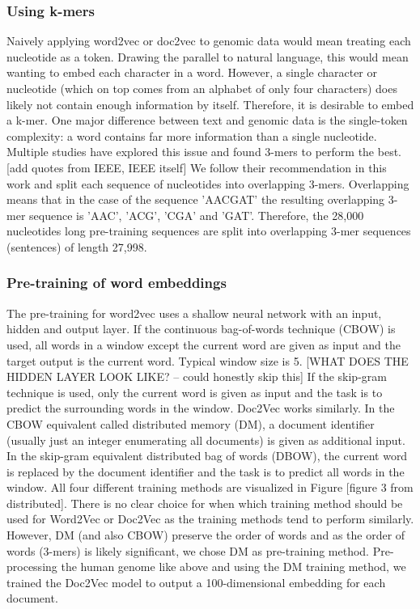 \subsubsection{Using k-mers}\label{subsubsec:kmers}
Naively applying word2vec or doc2vec to genomic data would mean treating each nucleotide as a token. Drawing the parallel to natural language, this would mean wanting to embed each character in a word. However, a single character or nucleotide (which on top comes from an alphabet of only four characters) does likely not contain enough information by itself. Therefore, it is desirable to embed a k-mer.
One major difference between text and genomic data is the single-token complexity: a word contains far more information than a single nucleotide.
Multiple studies have explored this issue and found 3-mers to perform the best. [add quotes from IEEE, IEEE itself] We follow their recommendation in this work and split each sequence of nucleotides into overlapping 3-mers. Overlapping means that in the case of the sequence 'AACGAT' the resulting overlapping 3-mer sequence is 'AAC', 'ACG', 'CGA' and 'GAT'. Therefore, the 28,000 nucleotides long pre-training sequences are split into overlapping 3-mer sequences (sentences) of length 27,998.
\subsubsection{Pre-training of word embeddings}
The pre-training for word2vec uses a shallow neural network with an input, hidden and output layer. If the continuous bag-of-words technique (CBOW) is used, all words in a window except the current word are given as input and the target output is the current word. Typical window size is 5. [WHAT DOES THE HIDDEN LAYER LOOK LIKE? -- could honestly skip this]
If the skip-gram technique is used, only the current word is given as input and the task is to predict the surrounding words in the window. Doc2Vec works similarly. In the CBOW equivalent called distributed memory (DM), a document identifier (usually just an integer enumerating all documents) is given as additional input. In the skip-gram equivalent distributed bag of words (DBOW), the current word is replaced by the document identifier and the task is to predict all words in the window. All four different training methods are visualized in Figure [figure 3 from distributed].
There is no clear choice for when which training method should be used for Word2Vec or Doc2Vec as the training methods tend to perform similarly. However, DM (and also CBOW) preserve the order of words and as the order of words (3-mers) is likely significant, we chose DM as pre-training method.
Pre-processing the human genome like above and using the DM training method, we trained the Doc2Vec model to output a 100-dimensional embedding for each document.
